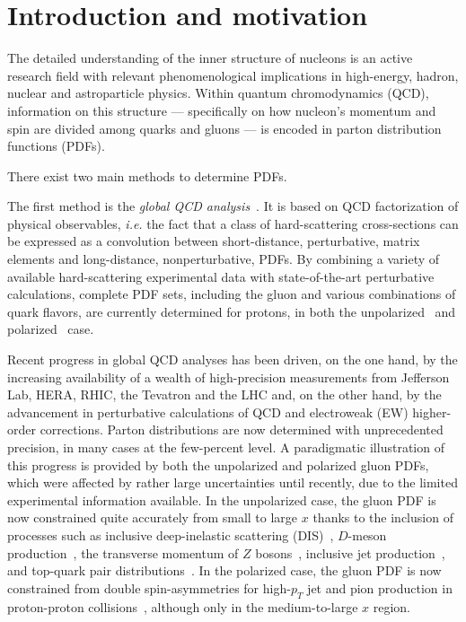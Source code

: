 \section{Introduction and motivation}

The detailed understanding of the inner structure of nucleons is an 
active research field with relevant phenomenological implications in 
high-energy, hadron, nuclear and astroparticle physics.
%
Within quantum chromodynamics (QCD), information on this structure ---
specifically on how nucleon's momentum and spin are divided among quarks and 
gluons --- is encoded in parton distribution functions (PDFs).

There exist two main methods to determine PDFs.

The first method is the {\it global QCD analysis}~\cite{Perez:2012um,
DeRoeck:2011na,Alekhin:2011sk,Ball:2012wy,Forte:2013wc,Jimenez-Delgado:2013sma,
Rojo:2015acz,Butterworth:2015oua,Accardi:2016ndt,Gao:2017yyd}.
%
It is based on QCD factorization of physical observables, {\it i.e.}
the fact that a class of hard-scattering cross-sections can be expressed as a 
convolution between short-distance, perturbative, matrix 
elements and long-distance, nonperturbative, PDFs.
%
By combining a variety of available hard-scattering experimental data with 
state-of-the-art perturbative calculations, complete PDF sets, including 
the gluon and various combinations of quark flavors, are currently determined
for protons, in both the unpolarized~\cite{Ball:2017nwa,Harland-Lang:2014zoa,
Dulat:2015mca,Alekhin:2017kpj,Accardi:2016qay} and 
polarized~\cite{Nocera:2014gqa,deFlorian:2009vb,Sato:2016tuz,Hirai:2008aj} case.

Recent progress in global QCD analyses has been driven, on the one hand, 
by the increasing availability of a wealth of high-precision measurements from 
Jefferson Lab, HERA, RHIC, the Tevatron and the LHC and, on the other hand, 
by the advancement in perturbative calculations of QCD and 
electroweak (EW) higher-order corrections.
%
Parton distributions are now determined with unprecedented precision, 
in many cases at the few-percent level.
%
A paradigmatic illustration of this progress is provided by both the 
unpolarized and polarized gluon PDFs, which were affected by rather large 
uncertainties until recently, due to the limited experimental information 
available.
%
In the unpolarized case, the gluon PDF is now constrained quite accurately from 
small to large $x$ thanks to the inclusion of processes such as 
inclusive deep-inelastic scattering (DIS)~\cite{Abramowicz:2015mha}, 
$D$-meson production~\cite{Zenaiev:2015rfa,Gauld:2016kpd},
the transverse momentum of $Z$ bosons~\cite{Boughezal:2017nla},
inclusive jet production~\cite{Currie:2016bfm}, and top-quark pair
distributions~\cite{Czakon:2016olj,Guzzi:2014wia}.
%
In the polarized case, the gluon PDF is now constrained from double 
spin-asymmetries for high-$p_T$ jet and pion production in proton-proton 
collisions~\cite{deFlorian:2014yva,Nocera:2014gqa}, 
although only in the medium-to-large $x$ region.

